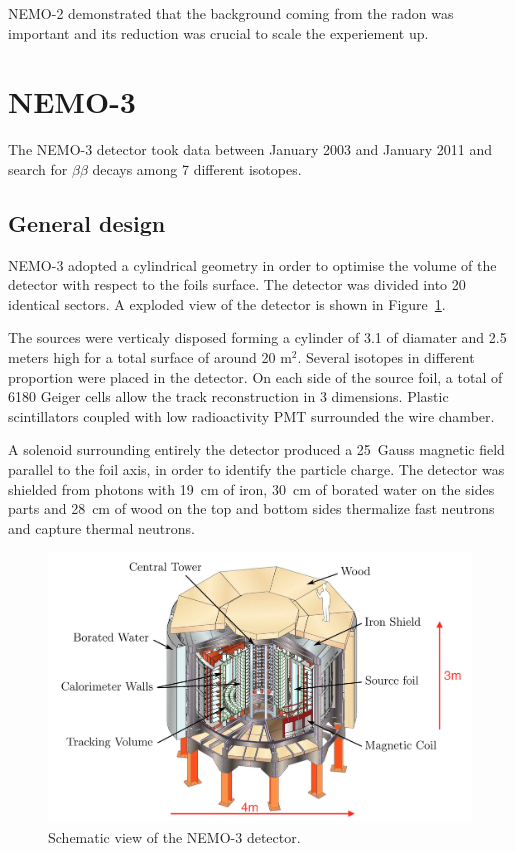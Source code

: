 \documentclass[main.tex]{subfiles}
\begin{document}
\bigskip


\NI NEMO-2 demonstrated that the background coming from the radon was important and its reduction was crucial to scale the experiement up.   


\FloatBarrier


\section{NEMO-3}\label{sec:NEMO3}


\NI The NEMO-3 detector took data between January 2003 and January 2011 and search for $\beta\beta$ decays among 7 different isotopes.


\subsection{General design}

\NI NEMO-3 adopted a cylindrical geometry in order to optimise the volume of the detector with respect to the foils surface. The detector was divided into 20 identical sectors. A exploded view of the detector is shown in Figure~\ref{NEMO3Detector}.


\bigskip

\NI The sources were verticaly disposed forming a cylinder of 3.1 of diamater and 2.5 meters high for a total surface of around 20 m$^\text{2}$. Several isotopes in different proportion were placed in the detector. On each side of the source foil, a total of 6180 Geiger cells allow the track reconstruction in 3 dimensions. Plastic scintillators coupled with low radioactivity PMT surrounded the wire chamber. 


\bigskip


\NI A solenoid surrounding entirely the detector produced a 25~Gauss magnetic field parallel to the foil axis, in order to identify the particle charge. The detector was shielded from photons with 19~cm of iron, 30~cm of borated water on the sides parts and 28~cm of wood on the top and bottom sides thermalize fast neutrons and capture thermal neutrons.  


\begin{figure}[h!]
\begin{center}
\includegraphics[scale=0.50]{pictures/Chap3/DetectorCrossSection.png}
\caption{Schematic view of the NEMO-3 detector.}
\label{NEMO3Detector}
\end{center}
\end{figure}
\end{document}
